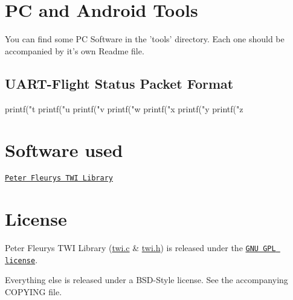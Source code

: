 \section*{P\-C and Android Tools}

You can find some P\-C Software in the 'tools' directory. Each one should be accompanied by it's own Readme file.

\subsection*{U\-A\-R\-T-\/\-Flight Status Packet Format}

\begin{DoxyVerb}printf("t%
printf("u%
printf("v%
printf("w%
printf("x%
printf("y%
printf("z%
\end{DoxyVerb}


\section*{Software used}


\begin{DoxyItemize}
\item \href{http://homepage.hispeed.ch/peterfleury/avr-software.html}{\tt Peter Fleurys T\-W\-I Library}
\end{DoxyItemize}

\section*{License}

Peter Fleurys T\-W\-I Library (\hyperlink{twi_8c_source}{twi.\-c} \& \hyperlink{twi_8h}{twi.\-h}) is released under the \href{http://www.gnu.org/licenses/gpl.html}{\tt G\-N\-U G\-P\-L license}.

Everything else is released under a B\-S\-D-\/\-Style license. See the accompanying C\-O\-P\-Y\-I\-N\-G file. 